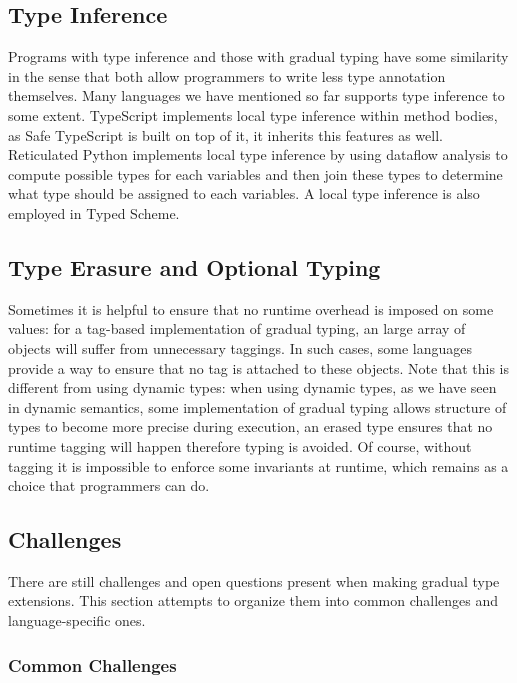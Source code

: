 \subsection{Type Inference}

Programs with type inference and those with gradual typing have some similarity in the sense
that both allow programmers to write less type annotation themselves.
Many languages we have mentioned so far supports type inference to some extent.
TypeScript implements local type inference within method bodies,
as Safe TypeScript is built on top of it, it inherits this features as well.
Reticulated Python implements local type inference by
using dataflow analysis to compute possible types for each variables
and then join these types to determine what type should be assigned to each variables.
A local type inference is also employed in Typed Scheme.

\subsection{Type Erasure and Optional Typing}

Sometimes it is helpful to ensure that no runtime overhead is imposed
on some values: for a tag-based implementation of gradual typing,
an large array of objects will suffer from unnecessary taggings.
In such cases, some languages provide a way to ensure that no tag is attached
to these objects.
Note that this is different from using dynamic types:
when using dynamic types, as we have seen in dynamic semantics,
some implementation of gradual typing allows structure of types to become more precise
during execution, an erased type ensures that no runtime tagging will happen
therefore typing is avoided.
Of course, without tagging it is impossible to enforce some invariants at runtime,
which remains as a choice that programmers can do.

\subsection{Challenges}

There are still challenges and open questions present when
making gradual type extensions. This section attempts to
organize them into common challenges and language-specific ones.

\subsubsection{Common Challenges}

